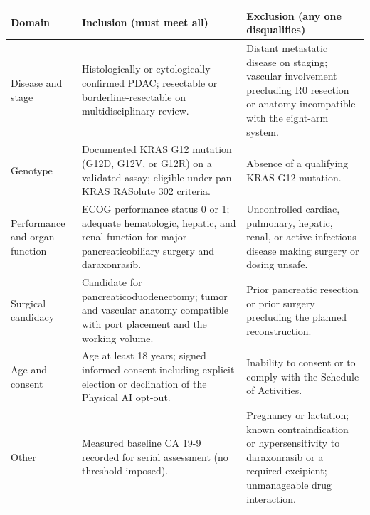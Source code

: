 \noindent\begin{tabularx}{\textwidth}{L{3.0cm} Y Y}
\toprule
\textbf{Domain} & \textbf{Inclusion (must meet all)} & \textbf{Exclusion (any one disqualifies)} \\
\midrule
Disease and stage & Histologically or cytologically confirmed PDAC; resectable or borderline-resectable on multidisciplinary review. & Distant metastatic disease on staging; vascular involvement precluding R0 resection or anatomy incompatible with the eight-arm system. \\
\addlinespace
Genotype & Documented KRAS G12 mutation (G12D, G12V, or G12R) on a validated assay; eligible under pan-KRAS RASolute 302 criteria. & Absence of a qualifying KRAS G12 mutation. \\
\addlinespace
Performance and organ function & ECOG performance status 0 or 1; adequate hematologic, hepatic, and renal function for major pancreaticobiliary surgery and daraxonrasib. & Uncontrolled cardiac, pulmonary, hepatic, renal, or active infectious disease making surgery or dosing unsafe. \\
\addlinespace
Surgical candidacy & Candidate for pancreaticoduodenectomy; tumor and vascular anatomy compatible with port placement and the working volume. & Prior pancreatic resection or prior surgery precluding the planned reconstruction. \\
\addlinespace
Age and consent & Age at least 18 years; signed informed consent including explicit election or declination of the Physical AI opt-out. & Inability to consent or to comply with the Schedule of Activities. \\
\addlinespace
Other & Measured baseline CA 19-9 recorded for serial assessment (no threshold imposed). & Pregnancy or lactation; known contraindication or hypersensitivity to daraxonrasib or a required excipient; unmanageable drug interaction. \\
\bottomrule
\end{tabularx}

